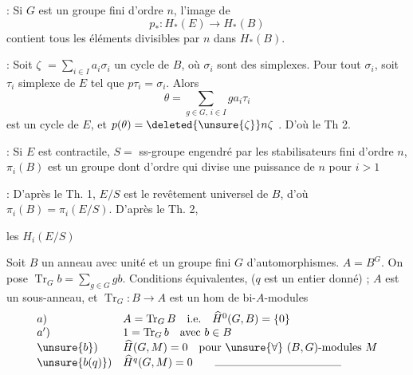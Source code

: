 
 : Si $G$ est un groupe fini d'ordre $n$, l'image de
\[
p_*:H_*(E)\longrightarrow H_*(B)
\]
contient tous les éléments  divisibles par $n$ dans $H_*(B)$.

 : Soit $\zeta$ $=\sum_{i\in I}a_i\sigma_i$ un cycle de $B$, où $\sigma_i$ sont des simplexes.
Pour tout $\sigma_i$, soit $\tau_i$ simplexe de $E$ tel que $p\tau_i=\sigma_i$. Alors
\[
\theta=\sum_{g\in G,\,i\in I}ga_i\tau_i
\]
est un cycle de $E$, et $p(\theta)=\deleted{\unsure{\zeta}}n\zeta$ . D'où le Th 2.

 : Si  $E$ est  contractile, $S=$ ss-groupe engendré par les stabilisateurs fini d'ordre $n$, $\pi_i(B)$ est un groupe  dont  d'ordre qui divise une puissance de $n$ pour $i>1$

 :  D'après le Th. 1, $E/S$ est le revêtement universel de $B$, d'où $\pi_i(B)=\pi_i(E/S)$. D'après le Th. 2,

 les $H_i(E/S)$


Soit $B$ un anneau avec unité et un groupe fini $G$ d'automorphismes. $A=B^G$. On pose $\operatorname{Tr}_G b=\sum_{g\in G}gb$. Conditions équivalentes, ($q$ est un entier donné) ; $A$ est un sous-anneau, et $\operatorname{Tr}_G:B\longrightarrow A$ est un hom de bi-$A$-modules
\[
\begin{array}{ll}
a)&A=\operatorname{Tr}_G B\quad\text{i.e.}\quad\widehat H^0(G,B)=\{0\}\\
a')&1=\operatorname{Tr}_G b\quad\text{avec }b\in B\\
\unsure{b})&\widehat H(G,M)=0\quad\text{pour }\unsure{\forall}\ (B,G)\text{-modules }M\\
\unsure{b(q)})&\widehat H^q(G,M)=0\qquad\rule{4cm}{.3pt}
\end{array}
\]

